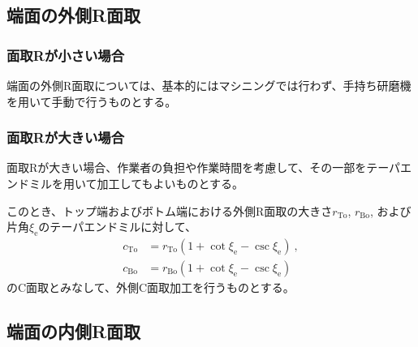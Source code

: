 \subsection{端面の外側R面取}

\subsubsection{面取Rが小さい場合}
端面の外側R面取については、基本的にはマシニングでは行わず、手持ち研磨機を用いて手動で行うものとする。

\subsubsection{面取Rが大きい場合}
面取Rが大きい場合、作業者の負担や作業時間を考慮して、その一部をテーパエンドミルを用いて加工してもよいものとする。

このとき、トップ端およびボトム端における外側R面取の大きさ$r_\mathrm{To}$, $r_\mathrm{Bo}$, および片角$\xi_\mathrm e$のテーパエンドミルに対して、
\begin{align*}
  c_\mathrm{To} &= r_\mathrm{To}\left(1+\cot\xi_\mathrm e-\csc\xi_\mathrm e\right)\ ,\\
  c_\mathrm{Bo} &= r_\mathrm{Bo}\left(1+\cot\xi_\mathrm e-\csc\xi_\mathrm e\right)
\end{align*}
のC面取とみなして、外側C面取加工を行うものとする。


\subsection{端面の内側R面取}

